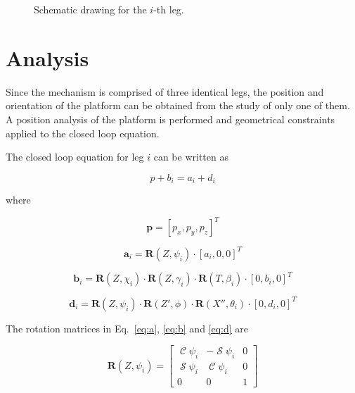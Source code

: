 \documentclass[titlepage, letterpaper, fleqn]{article}
\DeclareMathOperator{\cose}{\mathcal{C}}
\DeclareMathOperator{\sen}{\mathcal{S}}
\begin{document}
\begin{figure}[htbp]
\begin{subfigure}[b]{0.45\textwidth}
    \end{subfigure}
    \caption{Schematic drawing for the $i$-th leg.}
    \label{fig:schema}
\end{figure}

\section{Analysis}
\label{sec:analysis}

Since the mechanism is comprised of three identical legs, the position and orientation of the platform can be obtained from the study of only one of them. A position analysis of the platform is performed and geometrical constraints applied to the closed loop equation.

The closed loop equation for leg $i$ can be written as

\begin{equation}
\label{eq:closed_loop}
    p + b_i = a_i + d_i
\end{equation}

where 

\begin{equation}
    \label{eq:p}
    \mathbf{p} = [p_x, p_y, p_z]^T
\end{equation}

\begin{equation}
    \label{eq:a}
    \mathbf{a}_i = \mathbf{R}(Z,\psi_i) \cdot [a_i,0,0]^T
\end{equation}

\begin{equation}
    \label{eq:b}
    \mathbf{b}_i = \mathbf{R}(Z,\chi_i) \cdot \mathbf{R}(Z,\gamma_i) \cdot \mathbf{R}(T,\beta_i) \cdot [0, b_i, 0]^T
\end{equation}

\begin{equation}
    \label{eq:d}
    \mathbf{d}_i = \mathbf{R}(Z,\psi_i) \cdot \mathbf{R}(Z',\phi) \cdot \mathbf{R}(X'',\theta_{i}) \cdot [0, d_i, 0]^T
\end{equation}

The rotation matrices in Eq.~\ref{eq:a}, \ref{eq:b} and \ref{eq:d} are

\begin{equation}
    \label{eq:rot_Zpsi}
    \mathbf{R}(Z,\psi_i) =
    \begin{bmatrix}
        \cose\psi_i & -\sen\psi_i & 0 \\
        \sen\psi_i & \cose\psi_i & 0 \\
        0 & 0 & 1
    \end{bmatrix}
\end{equation}
\end{document}
